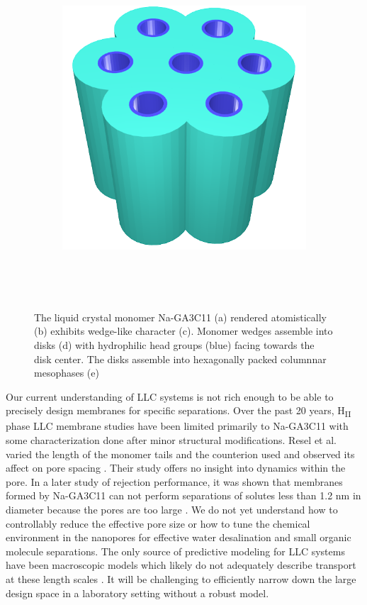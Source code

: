 \documentclass{article}
\begin{document}
\begin{figure}
\begin{subfigure}{0.4\linewidth}
		\centering
		\includegraphics[width=\textwidth]{hexagonal_packing.png}
		\caption{}~\label{fig:hex_packing_simple}
	\end{subfigure}
	\caption{The liquid crystal monomer Na-GA3C11 (a) rendered atomistically (b)
	exhibits wedge-like character (c). Monomer wedges assemble into disks (d) with
	hydrophilic head groups (blue) facing towards the disk center. The disks
	assemble into hexagonally packed columnnar mesophases (e)}~\label{fig:assembly}
  \end{figure}

  Our current understanding of LLC systems is not rich enough to be able to
  precisely design membranes for specific separations. Over the past 20 years,
  H\textsubscript{II} phase LLC membrane studies have been limited primarily to
  Na-GA3C11 with some characterization done after minor structural modifications.
  Resel et al. varied the length of the monomer tails and the counterion used and
  observed its affect on pore spacing \cite{resel_structural_2000}.  Their study
  offers no insight into dynamics within the pore. In a later study of rejection
  performance, it was shown that membranes formed by Na-GA3C11 can not perform
  separations of solutes less than 1.2 nm in diameter because the pores are too
  large \cite{zhou_supported_2005}.  We do not yet understand how to controllably
  reduce the effective pore size or how to tune the chemical environment in the
  nanopores for effective water desalination and small organic molecule
  separations. The only source of predictive modeling for LLC systems have been
  macroscopic models which likely do not adequately describe transport at these
  length scales \cite{hatakeyama_water_2011}. It will be challenging to
  efficiently narrow down the large design space in a laboratory setting without
  a robust model.
\end{document}
